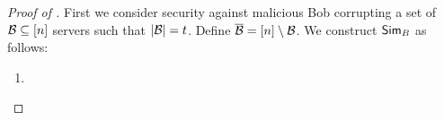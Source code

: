 \begin{proof}[Proof of ]
	First we consider security against malicious Bob corrupting a set of ${\mathcal B} \subseteq[n]$ servers such that $|{\mathcal B}| = t$.
	Define $\overline{{\mathcal B}} = [n]\setminus{\mathcal B}$.
	We construct $\mathsf{Sim}_B$ as follows:
	\begin{enumerate}
		\item 
	\end{enumerate}
\end{proof}





